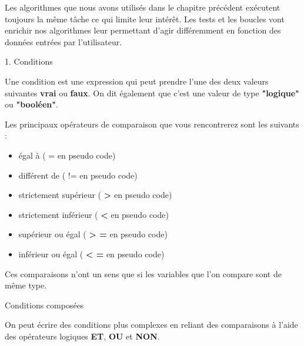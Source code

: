
Les algorithmes que nous avons utilisés dans le chapitre précédent exécutent toujours la même tâche ce qui limite leur intérêt. Les tests et les boucles vont enrichir nos algorithmes leur permettant d'agir différemment en fonction des données entrées par l'utilisateur.
\begin{h2}1. Conditions\end{h2}
Une condition est une expression qui peut prendre l'une des deux valeurs suivantes \textbf{vrai} ou \textbf{faux}. On dit également que c'est une valeur de type \textbf{"logique"} ou \textbf{"booléen"}.
\par
Les principaux opérateurs de comparaison que vous rencontrerez sont les suivants :
\begin{itemize}
     \item égal à ( = en pseudo code)
     \item différent de ( != en pseudo code)
     \item strictement supérieur (\textbf{  > } en pseudo code)
     \item strictement inférieur ( \textbf{ < } en pseudo code)
     \item supérieur ou égal ( \textbf{ > =} en pseudo code)
     \item inférieur ou égal (\textbf{  < =} en pseudo code)
\end{itemize}
Ces comparaisons n'ont un sens que si les variables que l'on compare sont de même type.
\bigbreak
\begin{h3}Conditions composées\end{h3}
On peut écrire des conditions plus complexes en reliant des comparaisons à l'aide des opérateurs logiques \textbf{ET},\textbf{ OU} et \textbf{NON}.

